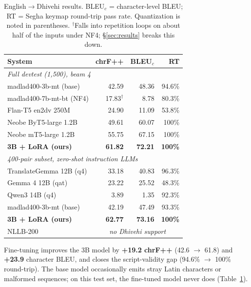 \documentclass[10pt,twocolumn]{article}
\newcommand{\resSevenChrf}{17.83$^\dagger$}
\newcommand{\resSevenBleu}{8.78}
\newcommand{\resSevenRt}{80.3\%}
\newcommand{\resTGChrf}{33.18}
\newcommand{\resTGBleu}{40.83}
\newcommand{\resTGRt}{96.3\%}
\newcommand{\resGFourChrf}{23.22}
\newcommand{\resGFourBleu}{25.52}
\newcommand{\resGFourRt}{48.3\%}
\newcommand{\resQwenChrf}{3.89}
\newcommand{\resQwenBleu}{1.35}
\newcommand{\resQwenRt}{92.3\%}
\begin{document}
\begin{table}[t]
\centering\small
\begin{tabular}{lrrr}
\toprule
System & chrF++ & BLEU$_c$ & RT \\
\midrule
\multicolumn{4}{l}{\emph{Full devtest (1{,}500), beam 4}}\\
madlad400-3b-mt (base)       & 42.59 & 48.36 & 94.6\% \\
madlad400-7b-mt-bt (NF4)     & \resSevenChrf{} & \resSevenBleu{} & \resSevenRt{} \\
Flan-T5 en2dv 250M \citep{flant5endv} & 24.90 & 11.09 & 53.8\% \\
Neobe ByT5-large 1.2B \citep{neobeendv} & 49.61 & 60.07 & 100\% \\
Neobe mT5-large 1.2B \citep{neobeendv} & 55.75 & 67.15 & 100\% \\
\textbf{3B + LoRA (ours)}    & \textbf{61.82} & \textbf{72.21} & \textbf{100\%} \\
\midrule
\multicolumn{4}{l}{\emph{400-pair subset, zero-shot instruction LLMs}}\\
TranslateGemma 12B (q4)      & \resTGChrf{} & \resTGBleu{} & \resTGRt{} \\
Gemma 4 12B (qat)            & \resGFourChrf{} & \resGFourBleu{} & \resGFourRt{} \\
Qwen3 14B (q4)               & \resQwenChrf{} & \resQwenBleu{} & \resQwenRt{} \\
madlad400-3b-mt (base)       & 42.19 & 47.49 & 93.3\% \\
\textbf{3B + LoRA (ours)}    & \textbf{62.77} & \textbf{73.16} & \textbf{100\%} \\
\midrule
NLLB-200 & \multicolumn{3}{c}{\emph{no Dhivehi support}} \\
\bottomrule
\end{tabular}
\caption{English$\to$Dhivehi results. BLEU$_c$ = character-level BLEU; RT =
Segha keymap round-trip pass rate. Quantization is noted in parentheses.
$^\dagger$Falls into repetition loops on about half of the inputs under
NF4; \S\ref{sec:results} breaks this down.}
\label{tab:main}
\end{table}

Fine-tuning improves the 3B model by \textbf{+19.2 chrF++} (42.6 $\to$
61.8) and \textbf{+23.9} character BLEU, and closes the script-validity
gap (94.6\% $\to$ 100\% round-trip). The base model occasionally emits
stray Latin characters or malformed sequences; on this test set, the
fine-tuned model never does (Table~\ref{tab:main}).
\end{document}
